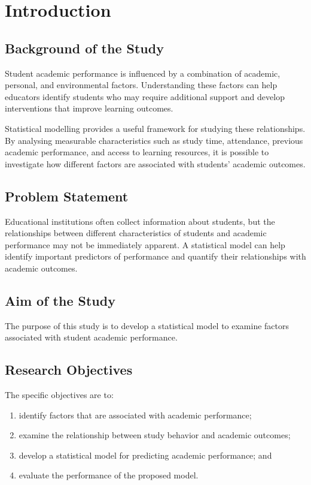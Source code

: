 \section{Introduction}

\subsection{Background of the Study}

Student academic performance is influenced by a combination of academic, personal, and environmental factors. Understanding these factors can help educators identify students who may require additional support and develop interventions that improve learning outcomes.

Statistical modelling provides a useful framework for studying these relationships. By analysing measurable characteristics such as study time, attendance, previous academic performance, and access to learning resources, it is possible to investigate how different factors are associated with students' academic outcomes.

\subsection{Problem Statement}

Educational institutions often collect information about students, but the relationships between different characteristics of students and academic performance may not be immediately apparent. A statistical model can help identify important predictors of performance and quantify their relationships with academic outcomes.

\subsection{Aim of the Study}

The purpose of this study is to develop a statistical model to examine factors associated with student academic performance.

\subsection{Research Objectives}

The specific objectives are to:

\begin{enumerate}
    \item identify factors that are associated with academic performance;
    \item examine the relationship between study behavior and academic outcomes;
    \item develop a statistical model for predicting academic performance; and
    \item evaluate the performance of the proposed model.
\end{enumerate}

